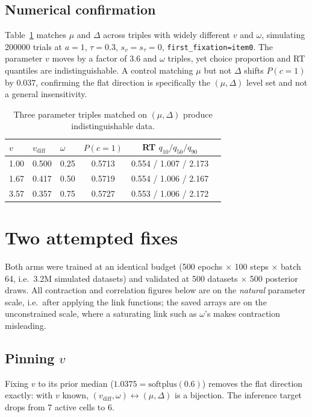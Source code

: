 \documentclass[11pt]{article}
\newcommand{\vdiff}{v_{\mathrm{diff}}}
\newcommand{\Dch}{\Delta}
\begin{document}
\subsection{Numerical confirmation}

Table~\ref{tab:flat} matches $\mu$ and $\Dch$ across triples with widely different
$v$ and $\omega$, simulating \num{200000} trials at $a=1$, $\tau=0.3$,
$s_v = s_\tau = 0$, \texttt{first\_fixation=item0}. The parameter $v$ moves by a
factor of $3.6$ and $\omega$ triples, yet choice proportion and RT quantiles are
indistinguishable. A control matching $\mu$ but not $\Dch$ shifts $P(c{=}1)$ by
$0.037$, confirming the flat direction is specifically the $(\mu,\Dch)$ level set and
not a general insensitivity.

\begin{table}[h]
\centering
\begin{tabular}{lll ccc}
\toprule
$v$ & $\vdiff$ & $\omega$ & $P(c{=}1)$ & RT $q_{10}/q_{50}/q_{90}$ \\
\midrule
1.00 & 0.500 & 0.25 & 0.5713 & 0.554 / 1.007 / 2.173 \\
1.67 & 0.417 & 0.50 & 0.5719 & 0.554 / 1.006 / 2.167 \\
3.57 & 0.357 & 0.75 & 0.5727 & 0.553 / 1.006 / 2.172 \\
\bottomrule
\end{tabular}
\caption{Three parameter triples matched on $(\mu,\Dch)$ produce
indistinguishable data.}
\label{tab:flat}
\end{table}

\section{Two attempted fixes}

Both arms were trained at an identical budget (500 epochs $\times$ 100 steps $\times$
batch 64, i.e.\ \num{3.2}M simulated datasets) and validated at 500 datasets
$\times$ 500 posterior draws. All contraction and correlation figures below are on the
\emph{natural} parameter scale, i.e.\ after applying the link functions; the saved
arrays are on the unconstrained scale, where a saturating link such as
$\omega$'s makes contraction misleading.

\subsection{Pinning $v$}

Fixing $v$ to its prior median ($1.0375 = \mathrm{softplus}(0.6)$) removes the flat
direction exactly: with $v$ known, $(\vdiff,\omega) \leftrightarrow (\mu,\Dch)$ is a
bijection. The inference target drops from 7 active cells to 6.
\end{document}
